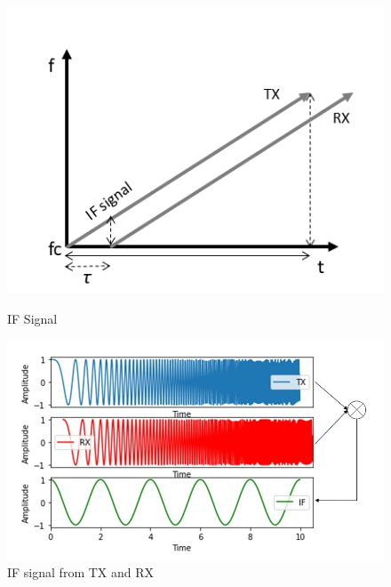 \begin{figure}[!tbp]
  \centering
  \begin{minipage}[b]{0.4\textwidth}
    \includegraphics[width=\textwidth]{Master's thesis/images/IFSignal.png}
    \caption{IF Signal}
    \label{fig:IF}
  \end{minipage}
  \hfill
  \begin{minipage}[b]{0.55\textwidth}
    \includegraphics[width=\textwidth]{Master's thesis/images/mixer.jpg}
    \caption{IF signal from TX and RX}
    \label{fig:Mixer}
  \end{minipage}
\end{figure}

